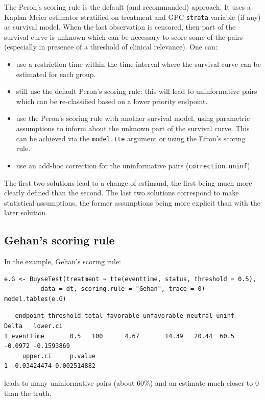 \documentclass[12pt]{article}
\begin{document}
The Peron's scoring rule is the default (and recommanded) approach. It
uses a Kaplan Meier estimator stratified on treatment and GPC \texttt{strata}
variable (if any) as survival model. When the last observation is
censored, then part of the survival curve is unknown which can be
necessary to score some of the pairs (especially in presence of a
threshold of clinical relevance). One can:
\begin{itemize}
\item use a restriction time within the time interval where the survival
curve can be estimated for each group.
\item still use the default Peron's scoring rule: this will lead to
uninformative pairs which can be re-classified based on a lower
priority endpoint.
\item use the Peron's scoring rule with another survival model, using
parametric assumptions to inform about the unknown part of the
survival curve. This can be achieved via the \texttt{model.tte} argument or
using the Efron's scoring rule.
\item use an add-hoc correction for the uninformative pairs
(\texttt{correction.uninf})
\end{itemize}

The first two solutions lead to a change of estimand, the first being
much more clearly defined than the second. The last two solutions
correspond to make statistical assumptions, the former assumptions
being more explicit than with the later solution.

\subsection{Gehan's scoring rule}
\label{sec:org8689e64}
In the example, Gehan's scoring rule:
\lstset{language=r,label= ,caption= ,captionpos=b,numbers=none}
\begin{lstlisting}
e.G <- BuyseTest(treatment ~ tte(eventtime, status, threshold = 0.5),
          data = dt, scoring.rule = "Gehan", trace = 0)
model.tables(e.G)
\end{lstlisting}

\begin{verbatim}
   endpoint threshold total favorable unfavorable neutral uninf   Delta   lower.ci
1 eventtime       0.5   100      4.67       14.39   20.44  60.5 -0.0972 -0.1593869
     upper.ci     p.value
1 -0.03424474 0.002514882
\end{verbatim}


leads to many uninformative pairs (about 60\%) and an estimate much
closer to 0 than the truth.
\end{document}
